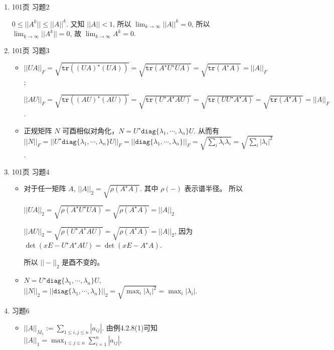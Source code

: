 \documentclass{article}
\begin{document}
\begin{spacing}{1.5}
\begin{enumerate}
    \item [5.] 101页 习题2 
    
    $0 \leq ||A^k|| \leq ||A||^k$. 又知 $||A|| < 1$, 所以 $\lim_{k\to\infty} ||A||^k = 0$, 所以 $\lim_{k\to\infty} ||A^k|| = 0$, 故 $\lim_{k\to\infty} A^k = 0$.

    \item [6.] 101页 习题3
    \begin{itemize}
        \item [(1)]
        $||UA||_F = \sqrt{\mathtt{tr}\left((UA)^\star(UA)\right)}=\sqrt{\mathtt{tr}(A^\star U^\star UA)} = \sqrt{\mathtt{tr}(A^\star A)} = ||A||_F$; 
    
        $||AU||_F = \sqrt{\mathtt{tr}\left((AU)^\star (AU)\right)}=\sqrt{\mathtt{tr}(U^\star A^\star AU)} = \sqrt{\mathtt{tr}(UU^\star A^\star A)} = \sqrt{\mathtt{tr}(A^\star A)} = ||A||_F$.
        \item [(2)]
        正规矩阵 $N$ 可酉相似对角化，$N = U^\star\mathtt{diag}\{\lambda_1, \cdots, \lambda_n\}U$. 从而有 $||N||_F = ||U^\star\mathtt{diag}\{\lambda_1, \cdots, \lambda_n\}U||_F = ||\mathtt{diag}\{\lambda_1, \cdots, \lambda_n\}||_F = \sqrt{\sum_i \bar{\lambda}_i\lambda_i} = \sqrt{\sum_i |\lambda_i|^2}$.

    \end{itemize}
    

    \item [7.] 101页 习题4
    \begin{itemize}
        \item [(1)]
        对于任一矩阵 $A$, $||A||_2 = \sqrt{\rho(A^\star A)}$. 其中 $\rho(-)$ 表示谱半径。 所以 
    
        $||UA||_2=\sqrt{\rho(A^\star U^\star U A)} = \sqrt{\rho(A^\star A)} = ||A||_2$
    
        $||AU||_2 = \sqrt{\rho(U^\star A^\star A U)} = \sqrt{\rho(A^\star A)} = ||A||_2$, 因为 $\det(xE - U^\star A^\star AU) = \det(xE - A^\star A)$.
    
        所以 $||-||_2$ 是酉不变的。
        \item [(2)]
        
        $N = U^\star\mathtt{diag}\{\lambda_1,\cdots,\lambda_n\}U$, $||N||_2=||\mathtt{diag}\{\lambda_1,\cdots,\lambda_n\}||_2=\sqrt{\max_{i} |\lambda_i|^2} = \max_{i} |\lambda_i|$.
    \end{itemize}
    
    \item [1.] 习题6
    
    \begin{itemize}
        \item [(1)] $||A||_{M_1} := \sum_{1\leq i, j\leq n} |a_{ij}|$. 由例4.2.8(1)可知 $||A||_1 = \max_{1\leq j\leq n} \sum_{i=1}^{n} |a_{ij}|$, 
        

\end{itemize}
\end{enumerate}
\end{spacing}
\end{document}
